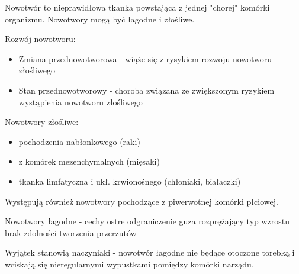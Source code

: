 \documentclass{article}
\begin{document}
Nowotwór to nieprawidłowa tkanka powstająca z jednej "chorej" komórki organizmu. Nowotwory mogą być łagodne i złośliwe.

Rozwój nowotworu:
\begin{itemize}
    \item Zmiana przednowotworowa - wiąże się z rysykiem rozwoju nowotworu złośliwego
    \item Stan przednowotworowy - choroba związana ze zwiększonym ryzykiem wystąpienia nowotworu złośliwego
\end{itemize}

Nowotwory złośliwe:
\begin{itemize}
    \item pochodzenia nabłonkowego (raki)
    \item z komórek mezenchymalnych (mięsaki)
    \item tkanka limfatyczna i ukł. krwionośnego (chłoniaki, białaczki)
\end{itemize}
Występują również nowotwory pochodzące z piwerwotnej komórki płciowej.

Nowotwory łagodne - cechy
ostre odgraniczenie guza
rozprężający typ wzrostu
brak zdolności tworzenia przerzutów

Wyjątek stanowią naczyniaki - nowotwór łagodne nie będące otoczone torebką i wciskają się nieregularnymi wypustkami pomiędzy komórki narządu.
\end{document}
